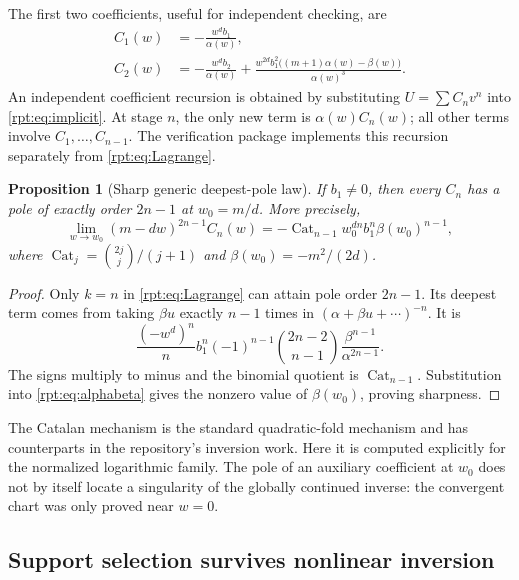 \documentclass[11pt,a4paper]{article}
\numberwithin{equation}{section}
\newtheorem{proposition}[theorem]{Proposition}
\theoremstyle{definition}\newtheorem{definition}[theorem]{Definition}
\theoremstyle{remark}\newtheorem{remark}[theorem]{Remark}
\newcommand{\Cat}{\operatorname{Cat}}
\begin{document}
The first two coefficients, useful for independent checking, are
\begin{align}
C_1(w)&=-\frac{w^d b_1}{\alpha(w)},
\label{rpt:eq:C1}\\
C_2(w)&=-\frac{w^d b_2}{\alpha(w)}
+\frac{w^{2d}b_1^2\bigl((m+1)\alpha(w)-\beta(w)\bigr)}{\alpha(w)^3}.
\label{rpt:eq:C2}
\end{align}
An independent coefficient recursion is obtained by substituting $U=\sum C_nv^n$ into \eqref{rpt:eq:implicit}. At stage $n$, the only new term is $\alpha(w)C_n(w)$; all other terms involve $C_1,\ldots,C_{n-1}$. The verification package implements this recursion separately from \eqref{rpt:eq:Lagrange}.

\begin{proposition}[Sharp generic deepest-pole law]
\label{rpt:prop:pole}
If $b_1\ne0$, then every $C_n$ has a pole of exactly order $2n-1$ at $w_0=m/d$. More precisely,
\begin{equation}
\lim_{w\to w_0}(m-dw)^{2n-1}C_n(w)
=-\Cat_{n-1}w_0^{dn}b_1^n\beta(w_0)^{n-1},
\label{rpt:eq:deepest}
\end{equation}
where $\Cat_j=\binom{2j}{j}/(j+1)$ and $\beta(w_0)=-m^2/(2d)$.
\end{proposition}
\begin{proof}
Only $k=n$ in \eqref{rpt:eq:Lagrange} can attain pole order $2n-1$. Its deepest term comes from taking $\beta u$ exactly $n-1$ times in $(\alpha+\beta u+\cdots)^{-n}$. It is
\[
\frac{(-w^d)^n}{n}b_1^n
(-1)^{n-1}\binom{2n-2}{n-1}\frac{\beta^{n-1}}{\alpha^{2n-1}}.
\]
The signs multiply to minus and the binomial quotient is $\Cat_{n-1}$. Substitution into \eqref{rpt:eq:alphabeta} gives the nonzero value of $\beta(w_0)$, proving sharpness.
\end{proof}

The Catalan mechanism is the standard quadratic-fold mechanism and has counterparts in the repository's inversion work. Here it is computed explicitly for the normalized logarithmic family. The pole of an auxiliary coefficient at $w_0$ does not by itself locate a singularity of the globally continued inverse: the convergent chart was only proved near $w=0$.

\subsection{Support selection survives nonlinear inversion}
\end{document}
